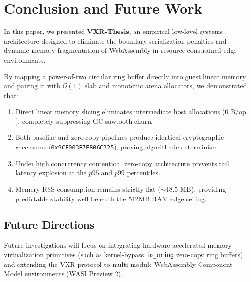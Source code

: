 \section{Conclusion and Future Work}
\label{sec:conclusion}

In this paper, we presented \textbf{VXR-Thesis}, an empirical low-level systems architecture designed to eliminate the boundary serialization penalties and dynamic memory fragmentation of WebAssembly in resource-constrained edge environments.

By mapping a power-of-two circular ring buffer directly into guest linear memory and pairing it with $\mathcal{O}(1)$ slab and monotonic arena allocators, we demonstrated that:
\begin{enumerate}
    \item Direct linear memory slicing eliminates intermediate host allocations ($0\text{ B/op}$), completely suppressing GC sawtooth churn.
    \item Both baseline and zero-copy pipelines produce identical cryptographic checksums (\texttt{0x9CF003B7F806C325}), proving algorithmic determinism.
    \item Under high concurrency contention, zero-copy architecture prevents tail latency explosion at the $p95$ and $p99$ percentiles.
    \item Memory RSS consumption remains strictly flat ($\sim 18.5\text{ MB}$), providing predictable stability well beneath the 512MB RAM edge ceiling.
\end{enumerate}

\subsection{Future Directions}
Future investigations will focus on integrating hardware-accelerated memory virtualization primitives (such as kernel-bypass \texttt{io\_uring} zero-copy ring buffers) and extending the VXR protocol to multi-module WebAssembly Component Model environments (WASI Preview 2).
